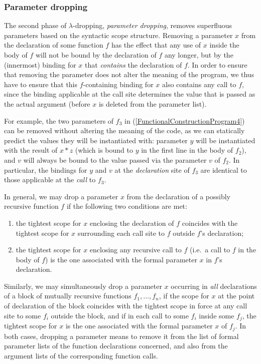 {\subsubsection{Parameter dropping}
\label{section:Part1:Semantics:lambdaDropping:parameterDropping}
The second phase of $\lambda$-dropping, \emph{parameter dropping},
removes superfluous parameters based on the syntactic scope structure.
Removing a parameter $x$ from the declaration of some function $f$ has
the effect that any use of $x$ inside the body of $f$ will not be
bound by the declaration of $f$ any longer, but by the (innermost)
binding for $x$ that \emph{contains} the declaration of $f$. In order
to ensure that removing the parameter does not alter the meaning of
the program, we thus have to ensure that this $f$-containing binding
for $x$ also contains any call to $f$, since the binding applicable at
the call site determines the value that is passed as the actual
argument (before $x$ is deleted from the parameter list).  

For example, the two parameters of $f_3$ in
(\ref{FunctionalConstructionProgram4}) can be removed without altering
the meaning of the code, as we can statically predict the values they
will be instantiated with: parameter $y$ will be instantiated with the
result of $x*z$ (which is bound to $y$ in the first line in the body
of $f_2$), and $v$ will always be bound to the value passed via the
parameter $v$ of $f_2$. In particular, the bindings for $y$ and $v$ at
the \emph{declaration} site of $f_3$ are identical to those applicable
at the \emph{call} to $f_3$.

In general, we may drop a parameter $x$ from the declaration of a
possibly recursive function $f$ if the following two conditions are met:
\begin{enumerate}
\item\label{ParameterDroppingConditionOne} the tightest scope for $x$
  enclosing the declaration of $f$ coincides with the tightest scope
  for $x$ surrounding each call site to $f$ outside $f$'s declaration;
\item\label{ParameterDroppingConditionTwo} the tightest scope for $x$
  enclosing any recursive call to $f$ (i.e.~a call to $f$ in the body
  of $f$) is the one associated with the formal parameter $x$ in $f$'s
  declaration.
\end{enumerate}

Similarly, we may simultaneously drop a parameter $x$ occurring in
\emph{all} declarations of a block of mutually recursive functions
$f_1,\ldots,f_n$, if the scope for $x$ at the point of declaration of
the block coincides with the tightest scope in force at any call site
to some $f_i$ outside the block, and if in each call to some $f_i$
inside some $f_j$, the tightest scope for $x$ is the one associated
with the formal parameter $x$ of $f_j$. In both cases, dropping a
parameter means to remove it from the list of formal parameter lists
of the function declarations concerned, and also from the argument
lists of the corresponding function calls.

}
